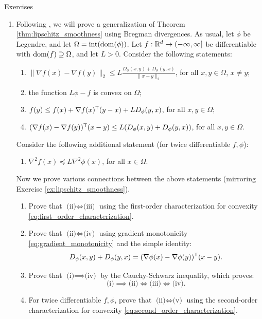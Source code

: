 \begin{xcb}{Exercises}
\begin{enumerate}[label=\thechapter.\arabic*]
\item Following \cite{bauschke2017descent}, we will prove a generalization of
  Theorem \ref{thm:lipschitz_smoothness} using Bregman divergences. As usual,
  let $\phi$ be Legendre, and let $\Omega = \operatorname{int}(\operatorname{dom}(\phi))$. Let $f :
  \mathbb{R}^d \to (-\infty, \infty]$ be differentiable with $\operatorname{dom}(f) \supseteq \Omega$,
  and let $L>0$. Consider the following statements:          
\begin{enumerate}[label=(\roman*)]
\item $\|\nabla f(x) - \nabla f(y)\|_2 \leq L \frac{D_\phi(x,y) + D_\phi(y,x)}
  {\|x-y\|_2}$, for all $x,y \in \Omega$, $x \not= y$;
\item the function $L\phi-f$ is convex on $\Omega$;
\item $f(y) \leq f(x) + \nabla f(x)^{\mathsf{T}} (y-x) + L D_\phi(y,x)$, for all $x,y \in
  \Omega$; 
\item $(\nabla f(x) - \nabla f(y))^{\mathsf{T}} (x - y) \leq L (D_\phi(x,y) +
  D_\phi(y,x))$, for all $x,y \in \Omega$. 
\end{enumerate}
Consider the following additional statement (for twice differentiable $f,\phi$):  
\begin{enumerate}
\item[(v)] $\nabla^2 f(x) \preceq L \nabla^2 \phi(x)$, for all $x \in \Omega$. 
\end{enumerate} 
Now we prove various connections between the above statements (mirroring
Exercise \ref{ex:lipschitz_smoothness}).

\begin{enumerate}[label=\alph*.]
\item Prove that $\text{(ii)} \iff \text{(iii)}$ using the first-order
  characterization for convexity \eqref{eq:first_order_characterization}.   

\item Prove that $\text{(ii)} \iff \text{(iv)}$ using gradient monotonicity
  \eqref{eq:gradient_monotonicity} and the simple identity:
  \[
  D_\phi(x,y) + D_\phi(y,x) = (\nabla\phi(x) - \nabla\phi(y))^{\mathsf{T}} (x-y).
  \]

\item Prove that $\text{(i)} \implies \text{(iv)}$ by the Cauchy-Schwarz
  inequality, which proves:  
  \[
  \text{(i)} \implies \text{(ii)} \iff \text{(iii)} \iff \text{(iv)}. 
  \]

\item For twice differentiable $f,\phi$, prove that $\text{(ii)} \iff \text{(v)}$
    using the second-order characterization for convexity
    \eqref{eq:second_order_characterization}.    


\end{enumerate}
\end{enumerate}
\end{xcb}
